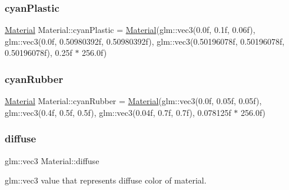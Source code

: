 \mbox{\label{struct_material_a24c31c15d55457a83429418bb8745e03}} 
\subsubsection{\texorpdfstring{cyanPlastic}{cyanPlastic}}
{\footnotesize\ttfamily \mbox{\hyperlink{struct_material}{Material}} Material\+::cyan\+Plastic = \mbox{\hyperlink{struct_material}{Material}}(glm\+::vec3(0.\+0f, 0.\+1f, 0.\+06f), glm\+::vec3(0.\+0f, 0.\+50980392f, 0.\+50980392f), glm\+::vec3(0.\+50196078f, 0.\+50196078f, 0.\+50196078f), 0.\+25f $\ast$ 256.\+0f)\hspace{0.3cm}{\ttfamily [static]}}

\mbox{\label{struct_material_a75c93c67433d5aafd1ed76aef97950a2}} 
\subsubsection{\texorpdfstring{cyanRubber}{cyanRubber}}
{\footnotesize\ttfamily \mbox{\hyperlink{struct_material}{Material}} Material\+::cyan\+Rubber = \mbox{\hyperlink{struct_material}{Material}}(glm\+::vec3(0.\+0f, 0.\+05f, 0.\+05f), glm\+::vec3(0.\+4f, 0.\+5f, 0.\+5f), glm\+::vec3(0.\+04f, 0.\+7f, 0.\+7f), 0.\+078125f $\ast$ 256.\+0f)\hspace{0.3cm}{\ttfamily [static]}}

\mbox{\label{struct_material_a099904e2f5a7bbec3cba6bf8ec546b11}} 
\subsubsection{\texorpdfstring{diffuse}{diffuse}}
{\footnotesize\ttfamily glm\+::vec3 Material\+::diffuse}



glm\+::vec3 value that represents diffuse color of material. 

\mbox{\label{struct_material_a187af0c557b8521fa0a88507ae618c42}} 

